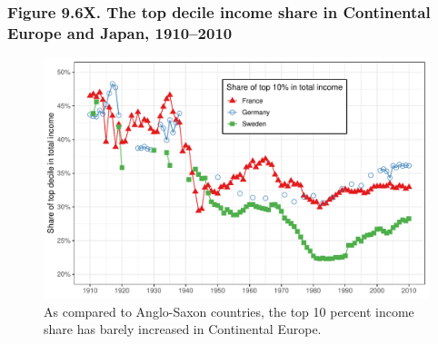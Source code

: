 \documentclass[t]{beamer}\usepackage[]{graphicx}\usepackage[]{color}
\newenvironment{knitrout}{}{} %
\begin{document}
\begin{frame}[label=Figure_9_6X]
\frametitle{Figure 9.6X. The top decile income share in Continental Europe and Japan, 1910--2010}
\begin{figure}[t]
\begin{minipage}[b]{\textwidth}
\centering
\begin{knitrout}\footnotesize
{}\color{fgcolor}

{\centering \includegraphics[width=1\linewidth]{figures/color/Figure_9_6X} 

}



\end{knitrout}
\caption{As compared to Anglo-Saxon countries, the top 10 percent income share has barely increased in Continental Europe.}
\end{minipage}
\end{figure}
\end{frame}
\end{document}

